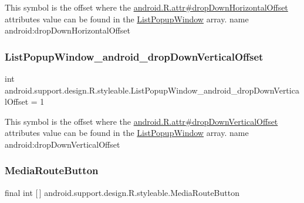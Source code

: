 This symbol is the offset where the \hyperlink{}{android.\+R.\+attr\#drop\+Down\+Horizontal\+Offset} attribute\textquotesingle{}s value can be found in the \hyperlink{classandroid_1_1support_1_1design_1_1R_1_1styleable_a90ef2283a7dff64bc22eed53a9aa1a73}{List\+Popup\+Window} array.  name android\+:drop\+Down\+Horizontal\+Offset \mbox{\label{classandroid_1_1support_1_1design_1_1R_1_1styleable_a22740fd93f1b8f84c40c5169d6884ff7}} 
\subsubsection{\texorpdfstring{List\+Popup\+Window\+\_\+android\+\_\+drop\+Down\+Vertical\+Offset}{ListPopupWindow\_android\_dropDownVerticalOffset}}
{\footnotesize\ttfamily int android.\+support.\+design.\+R.\+styleable.\+List\+Popup\+Window\+\_\+android\+\_\+drop\+Down\+Vertical\+Offset = 1\hspace{0.3cm}{\ttfamily [static]}}

This symbol is the offset where the \hyperlink{}{android.\+R.\+attr\#drop\+Down\+Vertical\+Offset} attribute\textquotesingle{}s value can be found in the \hyperlink{classandroid_1_1support_1_1design_1_1R_1_1styleable_a90ef2283a7dff64bc22eed53a9aa1a73}{List\+Popup\+Window} array.  name android\+:drop\+Down\+Vertical\+Offset \mbox{\label{classandroid_1_1support_1_1design_1_1R_1_1styleable_a13f16932c8dfbb7db000019830744f57}} 
\subsubsection{\texorpdfstring{Media\+Route\+Button}{MediaRouteButton}}
{\footnotesize\ttfamily final int \mbox{[}$\,$\mbox{]} android.\+support.\+design.\+R.\+styleable.\+Media\+Route\+Button\hspace{0.3cm}{\ttfamily [static]}}

